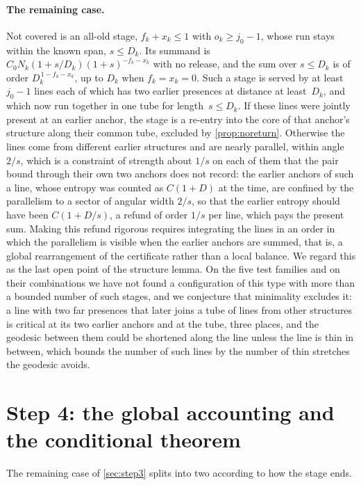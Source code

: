 \documentclass[11pt,letterpaper]{article}
\begin{document}
\paragraph{The remaining case.} Not covered is an all-old stage, $f_k+x_k\le1$ with $o_k\ge j_0-1$, whose run stays within the known span, $s\le D_k$. Its summand is $C_0N_k(1+s/D_k)(1+s)^{-f_k-x_k}$ with no release, and the sum over $s\le D_k$ is of order $D_k^{\,1-f_k-x_k}$, up to $D_k$ when $f_k=x_k=0$. Such a stage is served by at least $j_0-1$ lines each of which has two earlier presences at distance at least~$D_k$, and which now run together in one tube for length~$s\le D_k$. If these lines were jointly present at an earlier anchor, the stage is a re-entry into the core of that anchor's structure along their common tube, excluded by \cref{prop:noreturn}. Otherwise the lines come from different earlier structures and are nearly parallel, within angle $2/s$, which is a constraint of strength about $1/s$ on each of them that the pair bound through their own two anchors does not record: the earlier anchors of such a line, whose entropy was counted as $C(1+D)$ at the time, are confined by the parallelism to a sector of angular width $2/s$, so that the earlier entropy should have been $C(1+D/s)$, a refund of order $1/s$ per line, which pays the present sum. Making this refund rigorous requires integrating the lines in an order in which the parallelism is visible when the earlier anchors are summed, that is, a global rearrangement of the certificate rather than a local balance. We regard this as the last open point of the structure lemma. On the five test families and on their combinations we have not found a configuration of this type with more than a bounded number of such stages, and we conjecture that minimality excludes it: a line with two far presences that later joins a tube of lines from other structures is critical at its two earlier anchors and at the tube, three places, and the geodesic between them could be shortened along the line unless the line is thin in between, which bounds the number of such lines by the number of thin stretches the geodesic avoids.

\section{Step 4: the global accounting and the conditional theorem}
\label{sec:step4}

The remaining case of \cref{sec:step3} splits into two according to how the stage ends.
\end{document}
